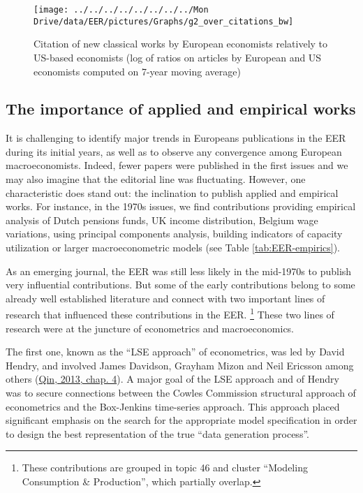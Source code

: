 \documentclass[
  12pt,
  onecolumn]{article}
\begin{document}
\begin{figure}[H]

{\centering \texttt{[image: ../../../../../../../../Mon Drive/data/EER/pictures/Graphs/g2\_over\_citations\_bw]} 

}

\caption{Citation of new classical works by European economists relatively to US-based economists (log of ratios on articles by European and US economists computed on 7-year moving average)}\label{fig:plot-new-classical}
\end{figure}

\hypertarget{the-importance-of-applied-and-empirical-works}{%
\subsection{The importance of applied and empirical
works}\label{the-importance-of-applied-and-empirical-works}}

It is challenging to identify major trends in Europeans publications in
the EER during its initial years, as well as to observe any convergence
among European macroeconomists. Indeed, fewer papers were published in
the first issues and we may also imagine that the editorial line was
fluctuating. However, one characteristic does stand out: the inclination
to publish applied and empirical works. For instance, in the 1970s
issues, we find contributions providing empirical analysis of Dutch
pensions funds, UK income distribution, Belgium wage variations, using
principal components analysis, building indicators of capacity
utilization or larger macroeconometric models (see Table
\ref{tab:EER-empirics}).

As an emerging journal, the EER was still less likely in the mid-1970s
to publish very influential contributions. But some of the early
contributions belong to some already well established literature and
connect with two important lines of research that influenced these
contributions in the EER. \footnote{These contributions are grouped in
  topic 46 and cluster ``Modeling Consumption \& Production'', which
  partially overlap.} These two lines of research were at the juncture
of econometrics and macroeconomics.

The first one, known as the ``LSE approach'' of econometrics, was led by
David Hendry, and involved James Davidson, Grayham Mizon and Neil
Ericsson among others (\protect\hyperlink{ref-qin2013a}{Qin, 2013, chap.
4}). A major goal of the LSE approach and of Hendry was to secure
connections between the Cowles Commission structural approach of
econometrics and the Box-Jenkins time-series approach. This approach
placed significant emphasis on the search for the appropriate model
specification in order to design the best representation of the true
``data generation process''.
\end{document}
